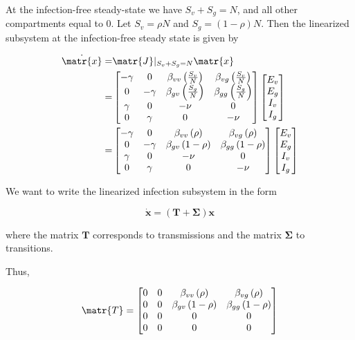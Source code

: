 \documentclass[11pt]{article}
\begin{document}
At the infection-free steady-state we have \( S_v + S_g = N \), and all other compartments equal to 0.
Let \( S_v = \rho N \) and \( S_g = (1 - \rho) N \).
Then the linearized subsystem at the infection-free steady state is given by

\begin{align*}
	\dot{\matr{x}} =& \matr{J}\rvert_{S_v + S_g = N} \matr{x}\\
	=& 
	\begin{bmatrix}
		-\gamma	& 0	&	\beta_{vv} \left( \frac{S_v}{N} \right)	&	\beta_{vg} \left( \frac{S_v}{N} \right)	\\
		0	&	-\gamma	&	\beta_{gv} \left( \frac{S_g}{N} \right)	&	\beta_{gg} \left( \frac{S_g}{N} \right)	\\
		\gamma	&	0	&	-\nu		&	0	\\
		0	&	\gamma	&	0	&	-\nu
	 \end{bmatrix}
	\begin{bmatrix} E_v \\ E_g \\ I_v \\ I_g \end{bmatrix} \\
	=& 
	\begin{bmatrix}
		-\gamma	& 0	&	\beta_{vv} \left( \rho \right)	&	\beta_{vg} \left( \rho \right)	\\
		0	&	-\gamma	&	\beta_{gv} \left( 1 - \rho \right)	&	\beta_{gg} \left( 1 - \rho \right)	\\
		\gamma	&	0	&	-\nu		&	0	\\
		0	&	\gamma	&	0	&	-\nu
	 \end{bmatrix}
	 \begin{bmatrix} E_v \\ E_g \\ I_v \\ I_g \end{bmatrix}
\end{align*}


We want to write the linearized infection subsystem in the form

\[ \dot{\bm{x}}=(\bm{T}+\bm{\Sigma}) \bm{x} \]

where the matrix \( \bm{T} \) corresponds to transmissions and the matrix \( \bm{\Sigma} \) to transitions.

Thus,

\[ \matr{T} = 
	\begin{bmatrix}
		0	& 0	&	\beta_{vv} \left( \rho \right)	&	\beta_{vg} \left( \rho \right)	\\
		0	&	0	&	\beta_{gv} \left( 1 - \rho \right)	&	\beta_{gg} \left( 1 - \rho \right)	\\
		0	&	0	&	0	&	0	\\
		0	&	0	&	0	&	0
	 \end{bmatrix}
\]
\end{document}

